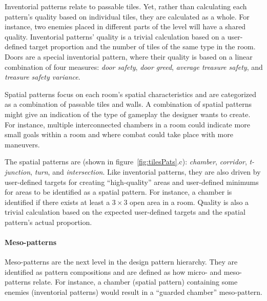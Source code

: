 Inventorial patterns relate to passable tiles. Yet, rather than calculating each pattern's quality based on individual tiles, they are calculated as a whole. For instance, two enemies placed in different parts of the level will have a shared quality. Inventorial patterns' quality is a trivial calculation based on a user-defined target proportion and the number of tiles of the same type in the room. Doors are a special inventorial pattern, where their quality is based on a linear combination of four measures: \emph{door safety}, \emph{door greed}, \emph{average treasure safety}, and \emph{treasure safety variance}.

Spatial patterns focus on each room's spatial characteristics and are categorized as a combination of passable tiles and walls. A combination of spatial patterns might give an indication of the type of gameplay the designer wants to create. For instance, multiple interconnected chambers in a room could indicate more small goals within a room and where combat could take place with more maneuvers.

The spatial patterns are (shown in figure~\ref{fig:tilesPats}.c): \emph{chamber}, \emph{corridor}, \emph{t-junction}, \emph{turn}, and \emph{intersection}. Like inventorial patterns, they are also driven by user-defined targets for creating ``high-quality'' areas and user-defined minimums for areas to be identified as a spatial pattern. For instance, a chamber is identified if there exists at least a $3 \times 3$ open area in a room. Quality is also a trivial calculation based on the expected user-defined targets and the spatial pattern's actual proportion.

 
\paragraph{Meso-patterns}

Meso-patterns are the next level in the design pattern hierarchy. They are identified as pattern compositions and are defined as how micro- and meso-patterns relate. For instance, a chamber (spatial pattern) containing some enemies (inventorial patterns) would result in a ``guarded chamber'' meso-pattern.

